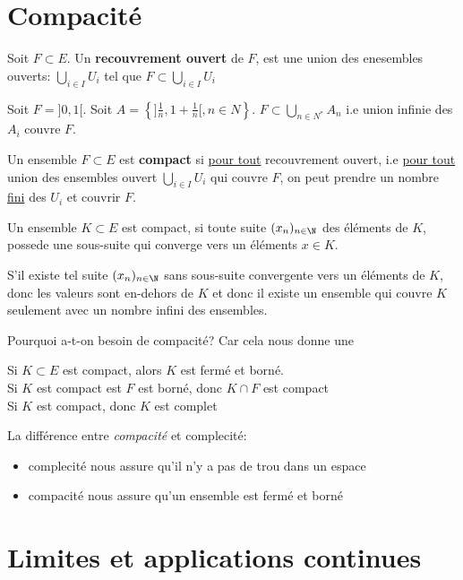 \section{Compacité}
\begin{definition}
    Soit $F \subset E$. Un \textbf{recouvrement ouvert} de $F$, est une union des enesembles ouverts:  $\bigcup_{i \in I} U_i$ tel que $F \subset \bigcup_{i \in I} U_i$
\end{definition}
\begin{eg}
    Soit $F = ]0, 1[$. Soit $A = \left\{]\frac{1}{n}, 1 + \frac{1}{n}[, n \in N\right\}$. $F \subset \bigcup_{n \in N^{*}} A_n$ i.e union infinie des $A_i$ couvre $F$.
\end{eg}
\begin{definition}
    Un ensemble $F \subset E$ est \textbf{compact} si \underline{pour tout} recouvrement ouvert, i.e \underline{pour tout} union des ensembles ouvert $\bigcup_{i \in I} U_i$ qui couvre $F$, on peut prendre un nombre \underline{fini} des  $U_i$ et couvrir $F$.
\end{definition}
\begin{theorem}
    Un ensemble $K \subset E$ est compact, si toute suite $(x_n)_{n \in \N}$ des éléments de $K$, possede une sous-suite qui converge  vers un éléments $x \in K$.
\end{theorem}
\begin{intuition}
    S'il existe tel suite $(x_n)_{n \in \N}$ sans sous-suite convergente vers un éléments de  $K$, donc les valeurs sont en-dehors de  $K$ et donc il existe un ensemble qui couvre $K$  seulement avec un nombre infini des ensembles. 
\end{intuition}
Pourquoi a-t-on besoin de compacité? Car cela nous donne une
\begin{prop}
    Si $K \subset E$ est compact, alors $K$ est fermé et borné.\\
    Si $K$ est compact est  $F$ est borné, donc  $K \cap F$ est compact\\
    Si $K$ est compact, donc  $K$ est complet
\end{prop}
\begin{property}
    La différence entre \textit{compacité} et {complecité}:
    \begin{itemize}
        \item complecité nous assure qu'il n'y a pas de trou dans un espace
        \item compacité nous assure qu'un ensemble est fermé et borné
    \end{itemize}
\end{property}
\section{Limites et applications continues}

